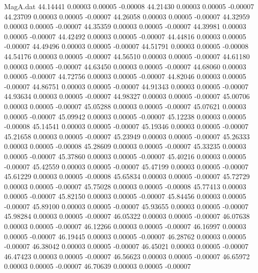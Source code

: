 \begin{filecontents}{MagA.dat}
  44.14441    0.00003    0.00005   -0.00008
  44.21430    0.00003    0.00005   -0.00007
  44.23709    0.00003    0.00005   -0.00007
  44.26058    0.00003    0.00005   -0.00007
  44.32959    0.00003    0.00005   -0.00007
  44.35359    0.00003    0.00005   -0.00007
  44.39981    0.00003    0.00005   -0.00007
  44.42492    0.00003    0.00005   -0.00007
  44.44816    0.00003    0.00005   -0.00007
  44.49496    0.00003    0.00005   -0.00007
  44.51791    0.00003    0.00005   -0.00008
  44.54176    0.00003    0.00005   -0.00007
  44.56510    0.00003    0.00005   -0.00007
  44.61180    0.00003    0.00005   -0.00007
  44.63450    0.00003    0.00005   -0.00007
  44.68060    0.00003    0.00005   -0.00007
  44.72756    0.00003    0.00005   -0.00007
  44.82046    0.00003    0.00005   -0.00007
  44.86751    0.00003    0.00005   -0.00007
  44.91343    0.00003    0.00005   -0.00007
  44.93634    0.00003    0.00005   -0.00007
  44.98327    0.00003    0.00005   -0.00007
  45.00706    0.00003    0.00005   -0.00007
  45.05288    0.00003    0.00005   -0.00007
  45.07621    0.00003    0.00005   -0.00007
  45.09942    0.00003    0.00005   -0.00007
  45.12238    0.00003    0.00005   -0.00008
  45.14541    0.00003    0.00005   -0.00007
  45.19346    0.00003    0.00005   -0.00007
  45.21658    0.00003    0.00005   -0.00007
  45.23949    0.00003    0.00005   -0.00007
  45.26333    0.00003    0.00005   -0.00008
  45.28609    0.00003    0.00005   -0.00007
  45.33235    0.00003    0.00005   -0.00007
  45.37860    0.00003    0.00005   -0.00007
  45.40216    0.00003    0.00005   -0.00007
  45.42559    0.00003    0.00005   -0.00007
  45.47199    0.00003    0.00005   -0.00007
  45.61229    0.00003    0.00005   -0.00008
  45.65834    0.00003    0.00005   -0.00007
  45.72729    0.00003    0.00005   -0.00007
  45.75028    0.00003    0.00005   -0.00008
  45.77413    0.00003    0.00005   -0.00007
  45.82150    0.00003    0.00005   -0.00007
  45.84456    0.00003    0.00005   -0.00007
  45.89100    0.00003    0.00005   -0.00007
  45.93655    0.00003    0.00005   -0.00007
  45.98284    0.00003    0.00005   -0.00007
  46.05322    0.00003    0.00005   -0.00007
  46.07638    0.00003    0.00005   -0.00007
  46.12266    0.00003    0.00005   -0.00007
  46.16997    0.00003    0.00005   -0.00007
  46.19445    0.00003    0.00005   -0.00007
  46.28762    0.00003    0.00005   -0.00007
  46.38042    0.00003    0.00005   -0.00007
  46.45021    0.00003    0.00005   -0.00007
  46.47423    0.00003    0.00005   -0.00007
  46.56623    0.00003    0.00005   -0.00007
  46.65972    0.00003    0.00005   -0.00007
  46.70639    0.00003    0.00005   -0.00007

\end{filecontents}
